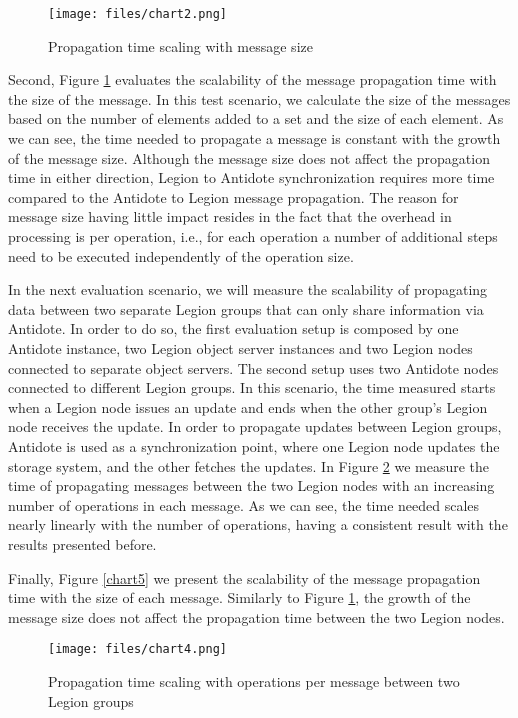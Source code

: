 \begin{figure}[h]
\centering
\texttt{[image: files/chart2.png]}
\caption{Propagation time scaling with message size}
\label{chart2}
\end{figure}

Second, Figure \ref{chart2} evaluates the scalability of the message propagation time with the size of the message. In this test scenario, we calculate the size of the messages based on the number of elements added to a set and the size of each element. As we can see, the time needed to propagate a message is constant with the growth of the message size. Although the message size does not affect the propagation time in either direction, Legion to Antidote synchronization requires more time compared to the Antidote to Legion message propagation. The reason for message size having little impact resides in the fact that the overhead in processing is per operation, i.e., for each operation a number of additional steps need to be executed independently of the operation size.\par
	In the next evaluation scenario, we will measure the scalability of propagating data between two separate Legion groups that can only share information via Antidote. In order to do so, the first evaluation setup is composed by one Antidote instance, two Legion object server instances and two Legion nodes connected to separate object servers. The second setup uses two Antidote nodes connected to different Legion groups. In this scenario, the time measured starts when a Legion node issues an update and ends when the other group's Legion node receives the update. In order to propagate updates between Legion groups, Antidote is used as a synchronization point, where one Legion node updates the storage system, and the other fetches the updates. In Figure \ref{chart4} we measure the time of propagating messages between the two Legion nodes with an increasing number of operations in each message. As we can see, the time needed scales nearly linearly with the number of operations, having a consistent result with the results presented before.\par
	Finally, Figure \ref{chart5} we present the scalability of the message propagation time with the size of each message. Similarly to Figure \ref{chart2}, the growth of the message size does not affect the propagation time between the two Legion nodes.

\begin{figure}[h]
\centering
\texttt{[image: files/chart4.png]}
\caption{Propagation time scaling with operations per message between two Legion groups}
\label{chart4}
\end{figure}


